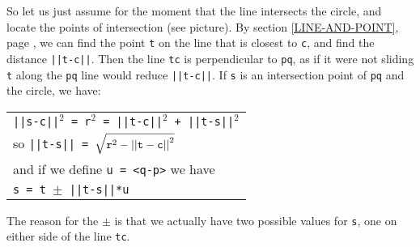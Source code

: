 \documentclass[12pt]{article}
\begin{document}
\bigskip

\begin{minipage}{\textwidth}\raggedright
\label{INTERSECTION-PICTURE}
\begin{wrapfigure}{r}{0.5\textwidth}
\end{wrapfigure}
So let us just assume for the moment that the line intersects
the circle, and locate the points of intersection (see picture).
By section \ref{LINE-AND-POINT}, page \pageref{LINE-AND-POINT},
we can find the point {\tt t} on the line that is closest to
{\tt c}, and find the distance {\tt ||t-c||}.  Then the line {\tt tc} is
perpendicular to {\tt pq}, as if it were not sliding {\tt t}
along the {\tt pq} line would reduce {\tt ||t-c||}.
If {\tt s} is an intersection point of {\tt pq} and the circle, we have: \\
\hspace*{0.2in}\begin{tabular}{@{}l}
    {\tt ||s-c||$^2$ = r$^2$ = ||t-c||$^2$ + ||t-s||$^2$} \\
    so {\tt ||t-s|| = $\sqrt{{\tt r}^2 - {\tt ||t-c||}^2}$} \\
    and if we define {\tt u = <q-p>} we have \\
    {\tt s = t $\pm$ ||t-s||*u} \\
    \end{tabular}
\end{minipage}

The reason for the $\pm$ is that we actually have two possible
values for {\tt s}, one on either side of the line {\tt tc}.
\end{document}
